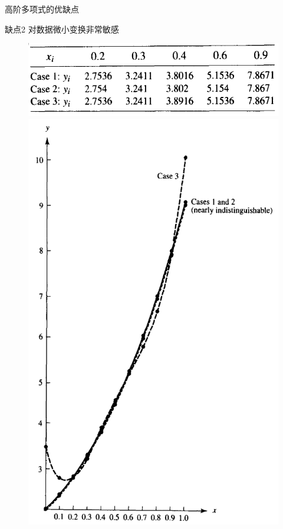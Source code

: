 \documentclass[UTF8]{ctexbeamer}
\begin{document}
\begin{frame}{高阶多项式的优缺点}
  \begin{block}{缺点2}
    对数据微小变换非常敏感
  \end{block}

  \begin{figure}
    \centering
    \includegraphics[width=.4\textwidth{}]{small-tab.png}
    \includegraphics[height=.7\textheight{}]{small-fig.png}
  \end{figure}

\end{frame}
\end{document}
